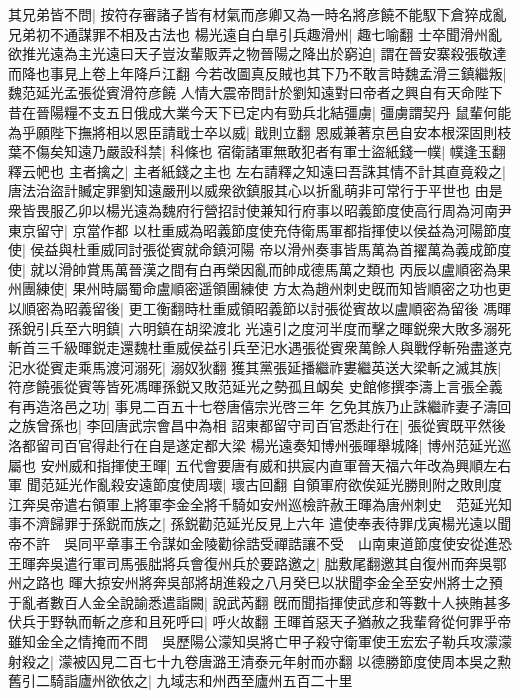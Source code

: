 其兄弟皆不問|{
	按符存審諸子皆有材氣而彦卿又為一時名將彦饒不能馭下倉猝成亂兄弟初不通謀罪不相及古法也}
楊光遠自白臯引兵趣滑州|{
	趣七喻翻}
士卒聞滑州亂欲推光遠為主光遠曰天子豈汝輩販弄之物晉陽之降出於窮迫|{
	謂在晉安寨殺張敬達而降也事見上卷上年降戶江翻}
今若改圖真反賊也其下乃不敢言時魏孟滑三鎮繼叛|{
	魏范延光孟張從賓滑符彦饒}
人情大震帝問計於劉知遠對曰帝者之興自有天命陛下昔在晉陽糧不支五日俄成大業今天下已定内有勁兵北結彊虜|{
	彊虜謂契丹}
鼠輩何能為乎願陛下撫將相以恩臣請戢士卒以威|{
	戢則立翻}
恩威兼著京邑自安本根深固則枝葉不傷矣知遠乃嚴設科禁|{
	科條也}
宿衛諸軍無敢犯者有軍士盜紙錢一幞|{
	幞逢玉翻釋云帊也}
主者擒之|{
	主者紙錢之主也}
左右請釋之知遠曰吾誅其情不計其直竟殺之|{
	唐法治盜計贓定罪劉知遠嚴刑以威衆欲鎮服其心以折亂萌非可常行于平世也}
由是衆皆畏服乙卯以楊光遠為魏府行營招討使兼知行府事以昭義節度使高行周為河南尹東京留守|{
	京當作都}
以杜重威為昭義節度使充侍衛馬軍都指揮使以侯益為河陽節度使|{
	侯益與杜重威同討張從賓就命鎮河陽}
帝以滑州奏事皆馬萬為首擢萬為義成節度使|{
	就以滑帥賞馬萬晉漢之間有白再榮因亂而帥成德馬萬之類也}
丙辰以盧順密為果州團練使|{
	果州時屬蜀命盧順密遥領團練使}
方太為趙州刺史旣而知皆順密之功也更以順密為昭義留後|{
	更工衡翻時杜重威領昭義節以討張從賓故以盧順密為留後}
馮暉孫銳引兵至六明鎮|{
	六明鎮在胡梁渡北}
光遠引之度河半度而擊之暉鋭衆大敗多溺死斬首三千級暉鋭走還魏杜重威侯益引兵至汜水遇張從賓衆萬餘人與戰俘斬殆盡遂克汜水從賓走乘馬渡河溺死|{
	溺奴狄翻}
獲其黨張延播繼祚婁繼英送大梁斬之滅其族|{
	符彦饒張從賓等皆死馮暉孫鋭又敗范延光之勢孤且衂矣}
史館修撰李濤上言張全義有再造洛邑之功|{
	事見二百五十七卷唐僖宗光啓三年}
乞免其族乃止誅繼祚妻子濤回之族曾孫也|{
	李回唐武宗會昌中為相}
詔東都留守司百官悉赴行在|{
	張從賓既平然後洛都留司百官得赴行在自是遂定都大梁}
楊光遠奏知博州張暉舉城降|{
	博州范延光巡屬也}
安州威和指揮使王暉|{
	五代會要唐有威和拱宸内直軍晉天福六年改為興順左右軍}
聞范延光作亂殺安遠節度使周瓌|{
	瓌古回翻}
自領軍府欲俟延光勝則附之敗則度江奔吳帝遣右領軍上將軍李金全將千騎如安州巡檢許赦王暉為唐州刺史　范延光知事不濟歸罪于孫鋭而族之|{
	孫鋭勸范延光反見上六年}
遣使奉表待罪戊寅楊光遠以聞帝不許　吳同平章事王令謀如金陵勸徐誥受禪誥讓不受　山南東道節度使安從進恐王暉奔吳遣行軍司馬張朏將兵會復州兵於要路邀之|{
	朏敷尾翻邀其自復州而奔吳鄂州之路也}
暉大掠安州將奔吳部將胡進殺之八月癸巳以狀聞李金全至安州將士之預于亂者數百人金全說諭悉遣詣闕|{
	說武芮翻}
旣而聞指揮使武彦和等數十人挾賄甚多伏兵于野執而斬之彦和且死呼曰|{
	呼火故翻}
王暉首惡天子猶赦之我輩脅從何罪乎帝雖知金全之情掩而不問　吳歷陽公濛知吳將亡甲子殺守衛軍使王宏宏子勒兵攻濛濛射殺之|{
	濛被囚見二百七十九卷唐潞王清泰元年射而亦翻}
以德勝節度使周本吳之勲舊引二騎詣廬州欲依之|{
	九域志和州西至廬州五百二十里}
